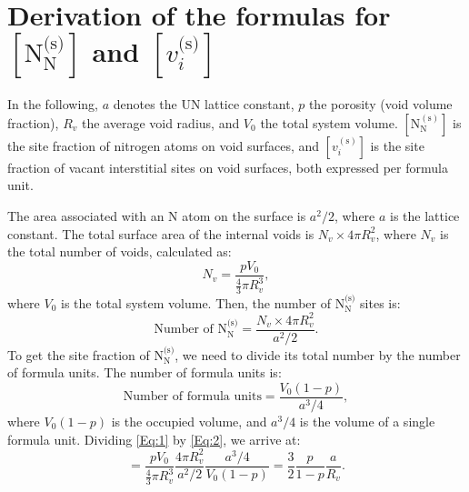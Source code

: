 \documentclass[preprint,12pt,sort&compress]{elsarticle}
\newcommand{\?}{\stackrel{?}{=}}
\begin{document}
\FloatBarrier
\newpage

\appendix

\section{Derivation of the formulas for $[ \text{N}_\text{N}^\text{(s)} ]$ and $[ v_i^\text{(s)} ]$}
\label{App1}

In the following, $a$ denotes the UN lattice constant, $p$ the porosity (void volume fraction), $R_v$ the average void radius, and $V_0$ the total system volume. $[\text{N}_\text{N}^{(\text{s})}]$ is the site fraction of nitrogen atoms on void surfaces, and $[v_i^{(\text{s})}]$ is the site fraction of vacant interstitial sites on void surfaces, both expressed per formula unit.

The area associated with an N atom on the surface is $a^2/2$, where $a$ is the lattice constant. The total surface area of the internal voids is $N_v \times 4 \pi R_v^2$, where $N_v$ is the total number of voids, calculated as:
\begin{equation}
N_v = \frac{ p V_0 }{ \frac{4}{3} \pi R_v^3 },
\end{equation}
where $V_0$ is the total system volume. Then, the number of $\text{N}_\text{N}^\text{(s)}$ sites is:
\begin{equation}
\text{Number of } \text{N}_\text{N}^\text{(s)} = \frac{ N_v \times 4 \pi R_v^2 } { a^2 / 2 }. 
\label{Eq:1}
\end{equation}
To get the site fraction of $\text{N}_\text{N}^\text{(s)}$, we need to divide its total number by the number of formula units. The number of formula units is:
\begin{equation}
\text{Number of formula units} = \frac{V_0 (1 - p)}{ a^3 / 4 }, 
\label{Eq:2}
\end{equation}
where $V_0 (1 - p)$ is the occupied volume, and $a^3 / 4$ is the volume of a single formula unit. Dividing \cref{Eq:1} by \cref{Eq:2}, we arrive at:
\begin{equation}
[ \text{N}_\text{N}^\text{(s)} ] = \frac{p V_0}{ \frac{4}{3} \pi R_v^3 } \frac{4 \pi R_v^2}{a^2/2}  \frac{ a^3/4 }{ V_0 (1 - p) } = \frac{3}{2} \frac{p}{1-p} \frac{a}{R_v}.
\label{Eq:NNs}
\end{equation}
\end{document}
